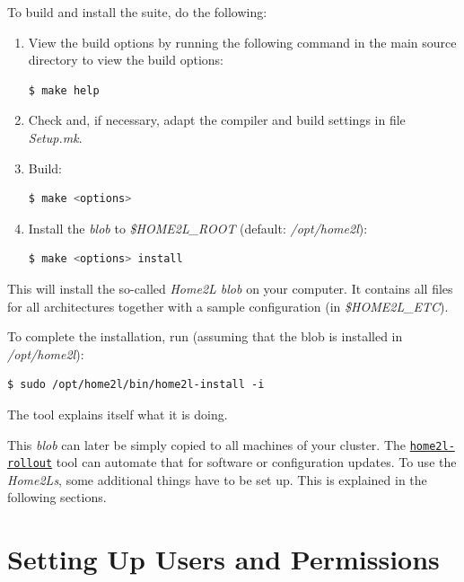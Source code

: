 \documentclass[12pt,english,parskip=half,headheight=19pt]{scrreprt}
\newcommand{\idx}[1]{#1\index{#1}}
\newcommand{\reftool}[1]{\hyperref[tool:#1]{\texttt{\idx{#1}}}}
\begin{document}
To build and install the suite, do the following:

\begin{enumerate}
\item
  View the build options by running the following command in the main
  source directory to view the build options:
  \begin{lstlisting}[language=bash]
    $ make help
  \end{lstlisting}
\item
  Check and, if necessary, adapt the compiler and build settings in file \textit{Setup.mk}.
\item
  Build:
  \begin{lstlisting}[language=bash]
    $ make <options>
  \end{lstlisting}
\item
  Install the \textit{blob} to \textit{\$HOME2L\_ROOT} (default: \textit{/opt/home2l}):
  \begin{lstlisting}[language=bash]
    $ make <options> install
  \end{lstlisting}
\end{enumerate}

This will install the so-called \textit{Home2L blob} on your computer. It
contains all files for all architectures together with a sample
configuration (in \textit{\$HOME2L\_ETC}).

To complete the installation, run (assuming that the blob is installed in \textit{/opt/home2l}):
\begin{lstlisting}
$ sudo /opt/home2l/bin/home2l-install -i
\end{lstlisting}

The tool explains itself what it is doing.

This \textit{blob} can later be simply
copied to all machines of your cluster. The \reftool{home2l-rollout} tool
can automate that for software or configuration updates.
To use the \textit{Home2Ls}, some additional things have to be set up.
This is explained in the following sections.





\section{Setting Up Users and Permissions}
\label{sec:installing-users}
\end{document}
